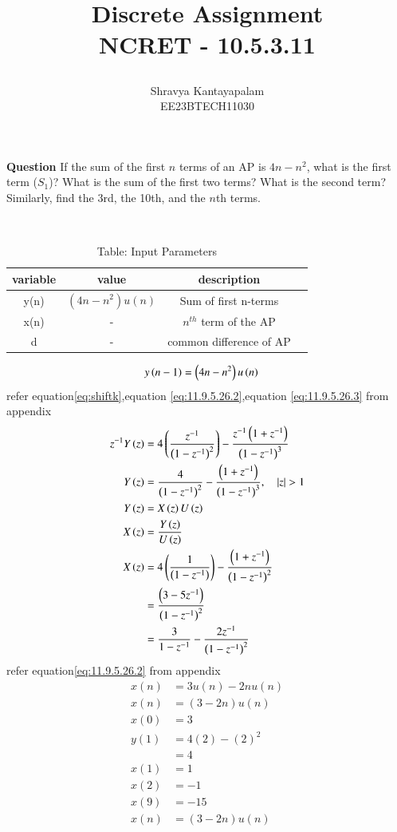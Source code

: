 \documentclass[a4,12pt,onecolumn]{IEEEtran}
\begin{document}
\title{
\Huge\textbf{ Discrete Assignment} \\
\textbf{NCRET - 10.5.3.11}
\author{Shravya Kantayapalam \\EE23BTECH11030}}
\maketitle
\textbf{Question} 
 If the sum of the first $ n $ terms of an AP is $4n - n^2$, what is the first term ($ S_1 $)? What is the sum of the first two terms? What is the second term? Similarly, find the 3rd, the 10th, and the $n$th terms.
 
\solution\\
\fi
\begin{table}[ht!]
\begin{center}
\begin{tabular}{|c|c|c|c|}
   \hline
   variable&value&description\\
   \hline 
   y(n)&$(4n-n^2)u(n)$& Sum of first n-terms\\
   \hline
   x(n)&-&$n^{th}$ term of the AP\\
   \hline 
   d&-&common difference of AP\\
   \hline
\end{tabular}
\caption{Table: Input Parameters}
\end{center}
\end{table}
\begin{align}
y\left(n-1\right)&=\left(4n-n^2\right)u\left(n\right)
\end{align}
refer equation\eqref{eq:shiftk},equation \eqref{eq:11.9.5.26.2},equation \eqref{eq:11.9.5.26.3} from appendix
\begin{align}
z^{-1}Y\brak{z} &=4\brak{\frac{z^{-1}}{\brak{1-z^{-1}}^2}}-\frac{z^{-1}\brak{1+z^{-1}}}{\brak{1-z^{-1}}^3}\\
Y\brak{z} &=\frac{4}{\brak{1-z^{-1}}^2}-\frac{\brak{1+z^{-1}}}{\brak{1-z^{-1}}^3},\quad{|z|>1}\\
Y\brak{z}&=X\brak{z}U\brak{z}\\
X\brak{z}&=\frac{Y\brak{z}}{U\brak{z}}\\
X\brak{z}&=4\brak{\frac{1}{\brak{1-z^{-1}}}}-\frac{\brak{1+z^{-1}}}{\brak{1-z^{-1}}^2}\\
&=\frac{\brak{3-5z^{-1}}}{\brak{1-z^{-1}}^2}\\
&=\frac{3}{1-z^{-1}}-\frac{2z^{-1}}{\brak{1-z^{-1}}^2}
\end{align}
refer equation\eqref{eq:11.9.5.26.2} from appendix
\begin{align}
    x(n)&=3u(n)-2nu(n)\\
    x(n)&=(3-2n)u(n)\\
    x(0) &=3\\
   y(1) &= 4(2) - (2)^2\\
    &=4\\
x(1) &= 1 \\
x(2) &= -1 \\
x(9) &= -15 \\
x(n)&=(3-2n)u(n)
\end{align}
\end{document}

